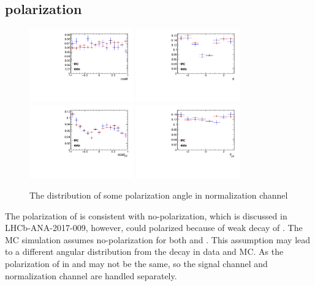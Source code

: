 \subsection{\Lc polarization}
\label{sec:getpoliweight}


\begin{figure}[bth]
\centering
\includegraphics[width=0.4\textwidth]{Figures/05_open_charm/04_tune/poli/pi_poli/cosTheta.pdf}%
\includegraphics[width=0.4\textwidth]{Figures/05_open_charm/04_tune/poli/pi_poli/phi.pdf}\\
\includegraphics[width=0.4\textwidth]{Figures/05_open_charm/04_tune/poli/pi_poli/cosTheta_pk.pdf}%
\includegraphics[width=0.4\textwidth]{Figures/05_open_charm/04_tune/poli/pi_poli/phi_pk.pdf}\\
\caption{ The distribution of some polarization angle in normalization channel}
\label{Fig.poli_pi}
\end{figure}


The polarization of \Lb is consistent with no-polarization, 
which is discussed in LHCb-ANA-2017-009, 
however, \Lc could polarized because of weak decay of \Lb. 
The MC simulation assumes no-polarization for both \Lb and \Lc. 
This assumption may lead to a different angular distribution from the \Lc decay in data and MC. 
As the polarization of \Lc in \LbLcDs and \LbLckkpi may not be the same, 
so the signal channel and normalization channel are handled separately.

